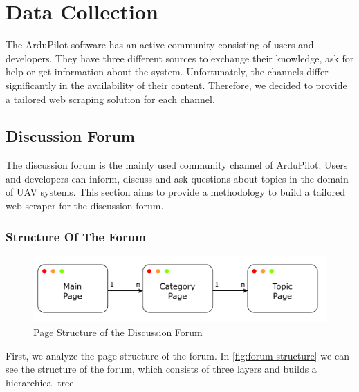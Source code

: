 \chapter{Data Collection}\label{ch:data-collection}

The ArduPilot software has an active community consisting of users and developers.
They have three different sources to exchange their knowledge, ask for help or get information about the system.
Unfortunately, the channels differ significantly in the availability of their content.
Therefore, we decided to provide a tailored web scraping solution for each channel.


\section{Discussion Forum}\label{sec:discussion-forum}
The discussion forum is the mainly used community channel of ArduPilot.
Users and developers can inform, discuss and ask questions about topics in the domain of \ac{UAV} systems.
This section aims to provide a methodology to build a tailored web scraper for the discussion forum.

\subsection{Structure Of The Forum}\label{subsec:structure-of-the-forum}
\begin{figure}
    \includegraphics[width=\textwidth]{figures/data_collection/forum_structure}
    \caption{Page Structure of the Discussion Forum}\label{fig:forum-structure}
\end{figure}
First, we analyze the page structure of the forum.
In \autoref{fig:forum-structure} we can see the structure of the forum, which consists of three layers and builds a hierarchical tree.

